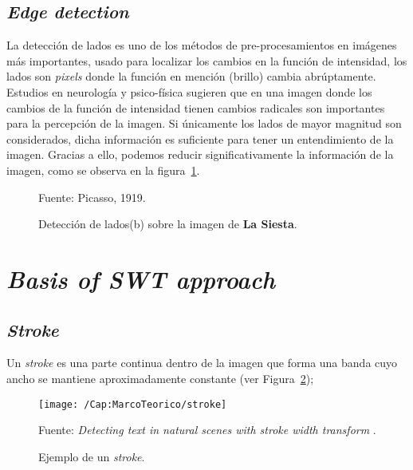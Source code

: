\subsection{\textit{Edge detection}}
  La detección de lados es uno de los métodos de pre-procesamientos en
  imágenes más importantes, usado para localizar los cambios en la función de 
  intensidad, los lados son \textit{pixels} donde la función en mención
  (brillo) cambia abrúptamente.
  Estudios en neurología y psico-física sugieren que en una imagen donde los
  cambios de la función de intensidad tienen cambios radicales son 
  importantes para la percepción de la imagen. Si únicamente los lados de 
  mayor magnitud son considerados, dicha información es suficiente para tener 
  un entendimiento de la imagen. Gracias a ello, podemos reducir 
  significativamente la información de la imagen, como se observa en la 
  figura~\ref{Fig:Cap-marcoteorico:LaSiesta}.
  \begin{figure}[h!]
    \centering
     { }
    \caption[\textit{Edge detection}]{Detección de lados(b) sobre la imagen
    de \textbf{La Siesta}.}\tiny{Fuente: Picasso, 1919.}
    \label{Fig:Cap-marcoteorico:LaSiesta}
  \end{figure}

\section{\textit{Basis of SWT approach}}
\label{sec:basics-swt}
\subsection{\textit{Stroke}}
Un \textit{stroke} es una parte continua dentro de la imagen que forma una
banda cuyo ancho se mantiene aproximadamente constante (ver 
Figura~\ref{Fig:cap-marcoteorico:Stroke});

\begin{figure}[h]
  \centering
  \texttt{[image: /Cap:MarcoTeorico/stroke]}
  \caption{Ejemplo de un \textit{stroke}.}
  \label{Fig:cap-marcoteorico:Stroke}\tiny{Fuente: \textit{Detecting text in 
  natural scenes with stroke width transform} \cite{Epshtein:SWT:2010}.}
\end{figure}

